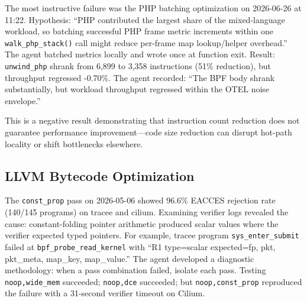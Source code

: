 \documentclass[sigplan,10pt,anonymous,nonacm]{acmart}
\begin{document}
The most instructive failure was the PHP batching optimization on 2026-06-26 at 11:22. Hypothesis: ``PHP contributed the largest share of the mixed-language workload, so batching successful PHP frame metric increments within one \texttt{walk\_php\_stack()} call might reduce per-frame map lookup/helper overhead.'' The agent batched metrics locally and wrote once at function exit. Result: \texttt{unwind\_php} shrank from 6,899 to 3,358 instructions (51\% reduction), but throughput regressed -0.70\%. The agent recorded: ``The BPF body shrank substantially, but workload throughput regressed within the OTEL noise envelope.''

This is a negative result demonstrating that instruction count reduction does not guarantee performance improvement---code size reduction can disrupt hot-path locality or shift bottlenecks elsewhere.

\subsection{LLVM Bytecode Optimization}

The \texttt{const\_prop} pass on 2026-05-06 showed 96.6\% EACCES rejection rate (140/145 programs) on tracee and cilium. Examining verifier logs revealed the cause: constant-folding pointer arithmetic produced scalar values where the verifier expected typed pointers. For example, tracee program \texttt{sys\_enter\_submit} failed at \texttt{bpf\_probe\_read\_kernel} with ``R1 type=scalar expected=fp, pkt, pkt\_meta, map\_key, map\_value.'' The agent developed a diagnostic methodology: when a pass combination failed, isolate each pass. Testing \texttt{noop,wide\_mem} succeeded; \texttt{noop,dce} succeeded; but \texttt{noop,const\_prop} reproduced the failure with a 31-second verifier timeout on Cilium.
\end{document}
